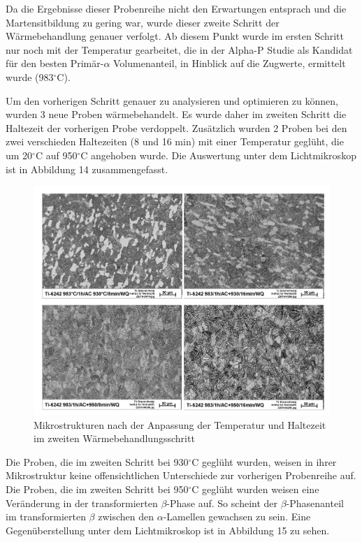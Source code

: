 \pagebreak

Da die Ergebnisse dieser Probenreihe nicht den Erwartungen entsprach und die Martensitbildung zu gering war, wurde dieser zweite Schritt der Wärmebehandlung genauer verfolgt. Ab diesem Punkt wurde im ersten Schritt nur noch mit der Temperatur gearbeitet, die in der Alpha-P Studie als Kandidat für den besten Primär-$\alpha$ Volumenanteil, in Hinblick auf die Zugwerte, ermittelt wurde (983$^\circ$C). 

Um den vorherigen Schritt genauer zu analysieren und optimieren zu können, wurden 3 neue Proben wärmebehandelt. Es wurde daher im zweiten Schritt die Haltezeit der vorherigen Probe verdoppelt. Zusätzlich wurden 2 Proben bei den zwei verschieden Haltezeiten (8 und 16 min) mit einer Temperatur geglüht, die um 20$^\circ$C auf 950$^\circ$C angehoben wurde. Die Auswertung unter dem Lichtmikroskop ist in Abbildung 14 zusammengefasst. 

\begin{figure}[h]
\centering
\includegraphics[width=0.9\linewidth]{"Bilder/Abbildung 14"}
\caption[Abbildung 14]{Mikrostrukturen nach der Anpassung der Temperatur und Haltezeit im zweiten Wärmebehandlungsschritt}
\label{fig:abbildung-14}
\end{figure}

Die Proben, die im zweiten Schritt bei 930$^\circ$C geglüht wurden, weisen in ihrer Mikrostruktur keine offensichtlichen Unterschiede zur vorherigen Probenreihe auf. Die Proben, die im zweiten Schritt bei 950$^\circ$C geglüht wurden weisen eine Veränderung in der transformierten $\beta$-Phase auf. So scheint der $\beta$-Phasenanteil im transformierten $\beta$ zwischen den $\alpha$-Lamellen gewachsen zu sein. Eine Gegenüberstellung unter dem Lichtmikroskop ist in Abbildung 15 zu sehen.

